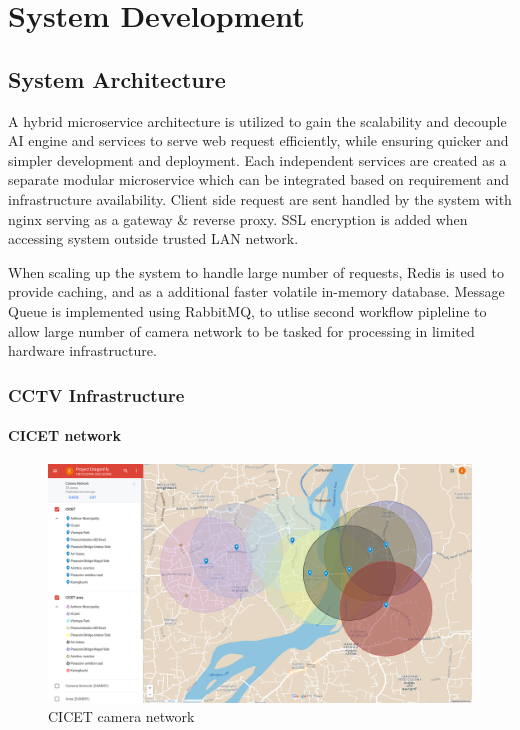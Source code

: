 \chapter{System Development}


\section{System Architecture}

A hybrid microservice architecture is utilized to gain the scalability and decouple AI engine and services to serve web request efficiently, while ensuring quicker and simpler development and deployment. Each independent services are created as a separate modular microservice which can be integrated based on requirement and infrastructure availability.
Client side request are sent handled by the system with nginx serving as a gateway \& reverse proxy. SSL encryption is added when accessing system outside trusted LAN network. 

When scaling up the system to handle large number of requests, Redis is used to provide caching, and as a additional faster volatile in-memory database. Message Queue is implemented using RabbitMQ, to utlise second workflow pipleline to allow large number of camera network to be tasked for processing in limited hardware infrastructure.


\subsection{CCTV Infrastructure}

\subsubsection{CICET network}
\begin{figure}[!ht]
	\centering
	\includegraphics[width=\linewidth]{Images/camera-network}
	\caption{CICET camera network}
	\label{fig:camera-network}
\end{figure}

